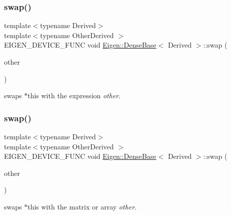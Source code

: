 \subsubsection{\texorpdfstring{swap()}{swap()}\hspace{0.1cm}{\footnotesize\ttfamily [1/2]}}
{\footnotesize\ttfamily template$<$typename Derived$>$ \\
template$<$typename Other\+Derived $>$ \\
E\+I\+G\+E\+N\+\_\+\+D\+E\+V\+I\+C\+E\+\_\+\+F\+U\+NC void \mbox{\hyperlink{class_eigen_1_1_dense_base}{Eigen\+::\+Dense\+Base}}$<$ Derived $>$\+::swap (\begin{DoxyParamCaption}\item[{const \mbox{\hyperlink{class_eigen_1_1_dense_base}{Dense\+Base}}$<$ Other\+Derived $>$ \&}]{other }\end{DoxyParamCaption})\hspace{0.3cm}{\ttfamily [inline]}}

swaps $\ast$this with the expression {\itshape other}. \mbox{\label{class_eigen_1_1_dense_base_aaab63cc56d30cc7c23a80304ab94ba2e}} 
\subsubsection{\texorpdfstring{swap()}{swap()}\hspace{0.1cm}{\footnotesize\ttfamily [2/2]}}
{\footnotesize\ttfamily template$<$typename Derived$>$ \\
template$<$typename Other\+Derived $>$ \\
E\+I\+G\+E\+N\+\_\+\+D\+E\+V\+I\+C\+E\+\_\+\+F\+U\+NC void \mbox{\hyperlink{class_eigen_1_1_dense_base}{Eigen\+::\+Dense\+Base}}$<$ Derived $>$\+::swap (\begin{DoxyParamCaption}\item[{\mbox{\hyperlink{class_eigen_1_1_plain_object_base}{Plain\+Object\+Base}}$<$ Other\+Derived $>$ \&}]{other }\end{DoxyParamCaption})\hspace{0.3cm}{\ttfamily [inline]}}

swaps $\ast$this with the matrix or array {\itshape other}. \mbox{\label{class_eigen_1_1_dense_base_aec3cf8f4f73c641d21a2c080c3e59662}} 
